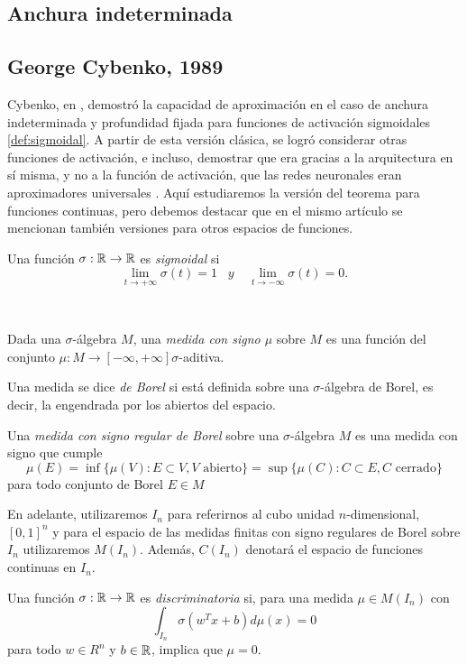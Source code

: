 \begin{itemize}
\section{Anchura indeterminada}
\subsection{George Cybenko, 1989}
Cybenko, en \cite{cybenko1989approximation}, demostró la capacidad de aproximación en el caso de anchura indeterminada y profundidad fijada para funciones de activación sigmoidales \autoref{def:sigmoidal}. A partir de esta versión clásica, se logró considerar otras funciones de activación, e incluso, demostrar que era gracias a la arquitectura en sí misma, y no a la función de activación, que las redes neuronales eran aproximadores universales \cite{Kurt1991251}. Aquí estudiaremos la versión del teorema para funciones continuas, pero debemos destacar que en el mismo artículo se mencionan también versiones para otros espacios de funciones.
\begin{definicion}\label{def:sigmoidal}
Una función $\sigma : \mathbb{R} \to \mathbb{R}$ es \emph{sigmoidal} si $$\lim_{t\to +\infty} \sigma(t)=1 \;\;\; y \;\;\;\; \lim_{t\to -\infty} \sigma(t)=0.$$
\end{definicion}\\

\begin{definicion}
Dada una $\sigma$-álgebra $M$, una \emph{medida con signo $\mu$} sobre $M$ es una función del conjunto $\mu: M\to [-\infty,+\infty] \sigma$-aditiva.
\end{definicion}
\begin{definicion}
Una medida se dice \emph{de Borel} si está definida sobre una $\sigma$-álgebra de Borel, es decir, la engendrada por los abiertos del espacio.
\end{definicion}
\begin{definicion}
Una \emph{medida con signo regular de Borel} sobre una $\sigma$-álgebra $M$ es una medida con signo que cumple $$\mu(E)=\inf\{\mu(V): E\subset V, V \text{ abierto}\}=\sup\{\mu(C): C\subset E, C\text{ cerrado}\}$$
para todo conjunto de Borel $E\in M$
\end{definicion}
En adelante, utilizaremos $I_n$ para referirnos al cubo unidad $n$-dimensional, $[0,1]^n$ y para el espacio de las medidas finitas con signo regulares de Borel sobre $I_n$ utilizaremos $M(I_n)$. Además, $C(I_n)$ denotará el espacio de funciones continuas en $I_n$.

\begin{definicion}\label{def:discriminatoria}
Una función $\sigma : \mathbb{R} \to \mathbb{R}$ es \emph{discriminatoria} si, para una medida $\mu \in M(I_n)$ con $$\int_{I_n} \sigma(w^Tx+b) d\mu(x)=0$$ para todo $ w\in R^n$ y $b\in\mathbb{R}$, implica que $\mu=0$.
\end{definicion}


\end{itemize}
